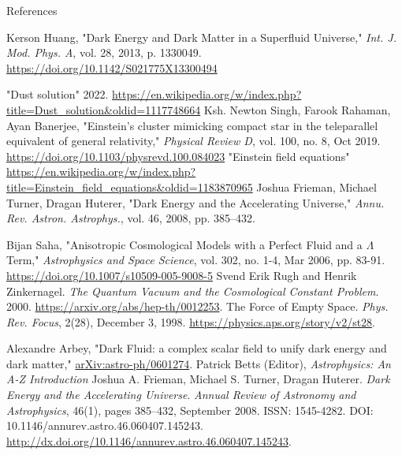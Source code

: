 \documentclass[aspectratio=169,xcolor=dvipsnames, t]{beamer}
\begin{document}
\begin{frame}{References}
    \footnotesize{
        \begin{thebibliography}{99}
Kerson Huang, "Dark Energy and Dark Matter in a Superfluid Universe," \textit{Int. J. Mod. Phys. A}, vol. 28, 2013, p. 1330049. 
\url{https://doi.org/10.1142/S021775X13300494}

"Dust solution" 2022.
\url{https://en.wikipedia.org/w/index.php?title=Dust_solution&oldid=1117748664}
Ksh. Newton Singh, Farook Rahaman, Ayan Banerjee, "Einstein's cluster mimicking compact star in the teleparallel equivalent of general relativity," \textit{Physical Review D}, vol. 100, no. 8, Oct 2019.
\url{https://doi.org/10.1103/physrevd.100.084023}
"Einstein field equations"
\url{https://en.wikipedia.org/w/index.php?title=Einstein_field_equations&oldid=1183870965}
Joshua Frieman, Michael Turner, Dragan Huterer, "Dark Energy and the Accelerating Universe," \textit{Annu. Rev. Astron. Astrophys.}, vol. 46, 2008, pp. 385–432.
 \end{thebibliography}
    }
\end{frame}
\begin{frame}
\vspace{1.5cm}
  \footnotesize{
        \begin{thebibliography}{99}
Bijan Saha, "Anisotropic Cosmological Models with a Perfect Fluid and a $\Lambda$ Term," \textit{Astrophysics and Space Science}, vol. 302, no. 1-4, Mar 2006, pp. 83-91.
\url{https://doi.org/10.1007/s10509-005-9008-5}
Svend Erik Rugh and Henrik Zinkernagel.
\textit{The Quantum Vacuum and the Cosmological Constant Problem}.
2000.
\url{https://arxiv.org/abs/hep-th/0012253}.
The Force of Empty Space.
\textit{Phys. Rev. Focus}, 2(28), December 3, 1998.
\url{https://physics.aps.org/story/v2/st28}.

Alexandre Arbey, "Dark Fluid: a complex scalar field to unify dark energy and dark matter," \url{arXiv:astro-ph/0601274}.
Patrick Betts (Editor), \textit{Astrophysics: An A-Z Introduction}
Joshua A. Frieman, Michael S. Turner, Dragan Huterer.
\textit{Dark Energy and the Accelerating Universe}.
\textit{Annual Review of Astronomy and Astrophysics}, 46(1), pages 385–432, September 2008.
ISSN: 1545-4282.
DOI: 10.1146/annurev.astro.46.060407.145243.
\url{http://dx.doi.org/10.1146/annurev.astro.46.060407.145243}.
        \end{thebibliography}
    }
  

\end{frame}



\makefinalpage
\end{document}
